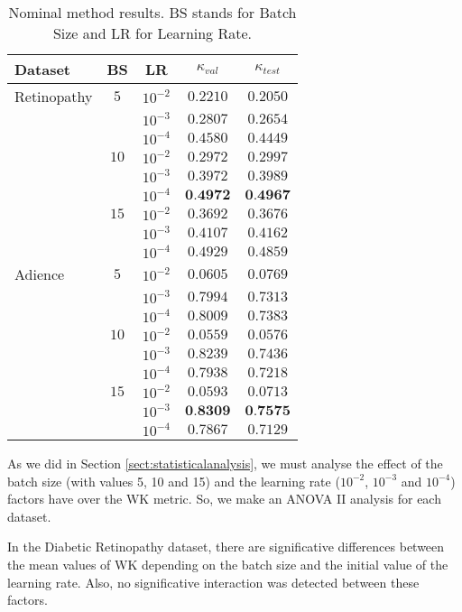 \documentclass[journal]{IEEEtran}
\begin{document}
	\begin{table}[!t]
		\caption{Nominal method results. BS stands for Batch Size and LR for Learning Rate.}
		\label{table:NominalResults}
		\footnotesize
		\centering
		\begin{tabular}{lcc|cc}
			Dataset & BS & LR & $\kappa_{val}$ & $\kappa_{test}$\\\hline
			Retinopathy & $5$ & $10^{-2}$ & $0.2210$ & $0.2050$\\
			 & & $10^{-3}$ & $0.2807$ & $0.2654$\\
			 & & $10^{-4}$ & $0.4580$ & $0.4449$\\
			
			 & $10$ & $10^{-2}$ & $0.2972$ & $0.2997$\\
			 &  & $10^{-3}$ & $0.3972$ & $0.3989$\\
			 &  & $10^{-4}$ & $\textbf{0.4972}$ & $\textbf{0.4967}$\\
			
			 & $15$ & $10^{-2}$ & $0.3692$ & $0.3676$\\
			 & & $10^{-3}$ & $0.4107$ & $0.4162$\\
			 & & $10^{-4}$ & $0.4929$ & $0.4859$\\
			\hline
			Adience & $5$ & $10^{-2}$ & $0.0605$ & $0.0769$\\
			 & & $10^{-3}$ & $0.7994$ & $0.7313$\\
			 & & $10^{-4}$ & $0.8009$ & $0.7383$\\
			
			 & $10$ & $10^{-2}$ & $0.0559$ & $0.0576$\\
			 & & $10^{-3}$ & $0.8239$ & $0.7436$\\
			 & & $10^{-4}$ & $0.7938$ & $0.7218$\\
			
			 & $15$ & $10^{-2}$ & $0.0593$ & $0.0713$\\
			 & & $10^{-3}$ & $\textbf{0.8309}$ & $\textbf{0.7575}$\\
			 & & $10^{-4}$ & $0.7867$ & $0.7129$\\
		\end{tabular}
	\end{table}
	
	As we did in Section \ref{sect:statisticalanalysis}, we must analyse the effect of the batch size (with values 5, 10 and 15) and the learning rate ($10^{-2}$, $10^{-3}$ and $10^{-4}$) factors have over the WK metric. So, we make an ANOVA II analysis for each dataset.
	
	In the Diabetic Retinopathy dataset, there are significative differences between the mean values of WK depending on the batch size and the initial value of the learning rate. Also, no significative interaction was detected between these factors.
	
\end{document}
